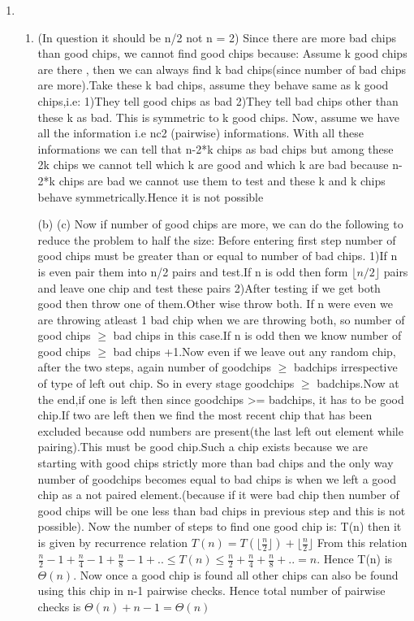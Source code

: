 \documentclass[12pt]{article}
\begin{document}
\begin{enumerate}
    \item
    \begin{enumerate}
        \item
        (In question it should be n/2 not n = 2)
        Since there are more bad chips than good chips, we cannot find good chips because:
        Assume k good chips are there , then we can always find k bad chips(since number of bad chips are more).Take these k bad chips, assume they behave same as k good chips,i.e:
        1)They tell good chips as bad
        2)They tell bad chips other than these k as bad.
        This is symmetric to k good chips.
        Now, assume we have all the information i.e nc2 (pairwise) informations. With all these informations we can tell that n-2*k chips as bad chips but among these 2k chips we cannot tell which k are good and which k are bad because n-2*k chips are bad we cannot use them to test and these k and k chips behave symmetrically.Hence it is not possible
        \item[(b)  (c)]
        Now if number of good chips are more, we can do the following to reduce the problem to half the size:
        Before entering first step number of good chips must be greater than or equal to number of bad chips.
        1)If n is even pair them into n/2 pairs and test.If n
        is odd then form $\lfloor{n/2} \rfloor$ pairs and leave one chip and test these pairs
        2)After testing if we get both good then throw one of them.Other wise throw both.
        If n were even we are throwing atleast 1 bad chip when we are throwing both, so number of good chips $\geq$ bad chips in this case.If n is odd then we know number of good chips $\geq$ bad chips +1.Now even if we leave out any random chip, after the two steps, again number of goodchips $\geq$ badchips irrespective of type of left out chip.
        So in every stage goodchips $\geq$ badchips.Now at the end,if one is left then since goodchips >= badchips, it has to be good chip.If two are left then we find the most recent chip that has been excluded because odd numbers are present(the last left out element while pairing).This must be good chip.Such a chip exists because we are starting with good chips strictly more than bad chips and the only way number of goodchips becomes equal to bad chips is when we left a good chip as a not paired element.(because if it were bad chip then number of good chips will be one less than bad chips in previous step and this is not possible).
        Now the number of steps to find one good chip is:
        T(n) then it is given by recurrence relation
        $T(n) = T(\lfloor \frac{n}{2} \rfloor) + \lfloor \frac{n}{2} \rfloor$
        From this relation 
        $\frac{n}{2}-1 + \frac{n}{4}-1 + \frac{n}{8}-1 +..\leq T(n) \leq  \frac{n}{2} + \frac{n}{4} + \frac{n}{8} +..  = n$.
        Hence T(n) is $\Theta(n)$.
        Now once a good chip is found all other chips can also be found using this chip in n-1 pairwise checks.
        Hence total number of pairwise checks is 
        $\Theta(n) + n-1 = \Theta(n)$
        

\end{enumerate}
\end{enumerate}
\end{document}
